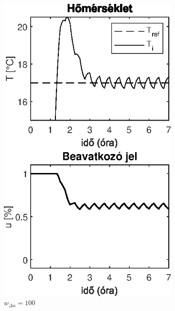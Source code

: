 \begin{figure}[H]
\begin{subfigure}[t]{0.32\textwidth}
	\centering
	\includegraphics[width=\textwidth]{figures/realsys/mpc-wdu-100}
	\caption{$w_{\Delta u}=100$}
	\label{fig:mpc-wdu-100}
\end{subfigure}
~
\begin{subfigure}[t]{0.32\textwidth}
	\centering

\end{subfigure}
\end{figure}
